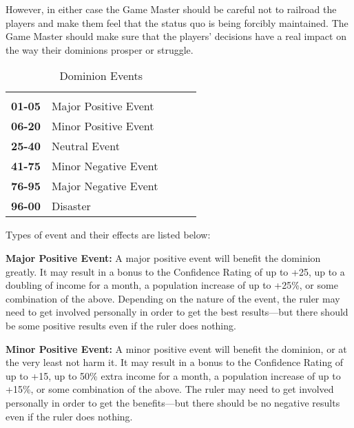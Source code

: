 \begin{multicols*}{2}
However, in either case the Game Master should be careful not to railroad the players and make them feel that the status quo is being forcibly maintained. The Game Master should make sure that the players’ decisions have a real impact on the way their dominions prosper or struggle.

\begin {table}[H]
  \caption{Dominion Events}\label{tab:Dominion Events}
  \begin{tabularx}{\columnwidth}{>{\bfseries}YYYYY}
	 & \\
	01-05 & Major Positive Event\\
	06-20 & Minor Positive Event\\
	25-40 & Neutral Event\\
	41-75 & Minor Negative Event\\
	76-95 & Major Negative Event\\
	96-00 & Disaster
  \end {tabularx}
\end {table}

Types of event and their effects are listed below:

\textbf{Major Positive Event:} A major positive event will benefit the dominion greatly. It may result in a bonus to the Confidence Rating of up to +25, up to a doubling of income for a month, a population increase of up to +25\%, or some combination of the above. Depending on the nature of the event, the ruler may need to get involved personally in order to get the best results—but there should be some positive results even if the ruler does nothing.


\textbf{Minor Positive Event:} A minor positive event will benefit the dominion, or at the very least not harm it. It may result in a bonus to the Confidence Rating of up to +15, up to 50\% extra income for a month, a population increase of up to +15\%, or some combination of the above. The ruler may need to get involved personally in order to get the benefits—but there should be no negative results even if the ruler does nothing.



\end{multicols*}
